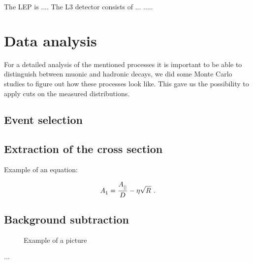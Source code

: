 \documentclass[epj,nopacs]{svjour}
\begin{document}
The LEP is ....
The L3 detector consists of ...
.....
\section{ Data analysis}

For a detailed analysis of the mentioned processes it is important to be able
to distinguish between muonic and hadronic decays, we did some Monte Carlo
studies to figure out how these processes look like. This gave us the
possibility to apply cuts on the measured distributions.

\subsection{ Event selection}

\subsection{Extraction of the cross section}

Example of an equation:

\begin{equation}
\label{a1vm}
A_{1}^{} = \frac{A^{}_{||}}{D^{}}  - \eta \sqrt{R^{}}\ . \\
\end{equation}


\subsection{Background subtraction}

\begin{figure}[ht]
\vspace*{-0.2cm}
\caption{\baselineskip=0.38cm Example of a picture}
\label{fig:1}   
\end{figure} 
...
\end{document}
